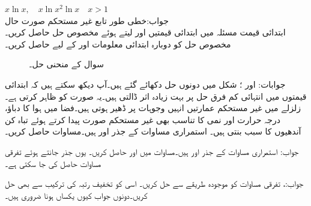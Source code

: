 $x\ln x, \quad x\ln x^2 \ln x\quad x>1$\\
جواب:خطی طور تابع
\quad غیر مستحکم صورت حال\\
ابتدائی قیمت مسئلہ  میں ابتدائی قیمتیں  اور  لیتے ہوئے مخصوص حل حاصل کریں۔مخصوص حل کو دوبارہ ابتدائی معلومات  اور  کے لیے حاصل کریں۔


\begin{figure}
\centering
{}
\caption{سوال  کے منحنی حل۔}
\label{شکل_سوال_سادہ_دو_درجی_غیر_مستحکم_الف}
\end{figure}

جوابات: اور ؛ شکل  میں دونوں حل دکھائے گئے ہیں۔آپ دیکھ سکتے ہیں کہ ابتدائی قیمتوں میں انتہائی کم فرق حل پر بہت زیادہ اثر ڈالتی ہیں۔یہ   صورت کو ظاہر کرتی ہے۔زلزلے  میں غیر مستحکم عمارتیں انہیں وجوہات پر ڈھیر ہوتی ہیں۔فضا میں ہوا کا دباؤ، درجہ حرارت اور نمی کا تناسب بھی غیر مستحکم صورت پیدا کرتے ہوئے  تباہ کن آندھیوں کا سبب بنتی ہیں۔
استمراری مساوات کے جذر  اور  ہیں۔مساوات  حاصل کریں۔

جواب: 
استمراری مساوات کے جذر  اور  ہیں۔مساوات  میں   اور  حاصل کریں۔ یوں جذر جانتے ہوئے تفرقی مساوات حاصل کی جا سکتی ہے۔

جواب:، 
تفرقی مساوات  کو موجودہ طریقے سے حل کریں۔ اسی کو تخفیف رتبہ کی ترکیب سے بھی حل  کریں۔دونوں جواب کیوں یکساں ہونا ضروری ہیں۔

